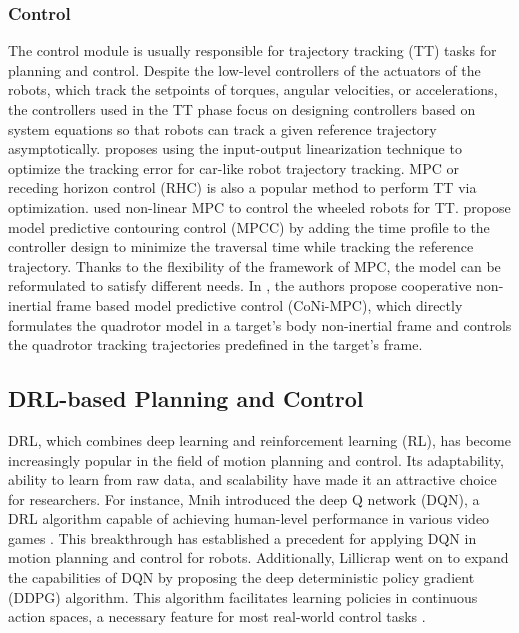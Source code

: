 \documentclass[letterpaper,journal,twoside]{IEEEtran}
\begin{document}
\subsubsection{Control}
The control module is usually responsible for trajectory 
tracking (TT) tasks for planning and control.
Despite the low-level controllers of the actuators of the 
robots, which track the setpoints of torques, angular 
velocities, or accelerations, the controllers used in the TT
phase focus on designing controllers based on system
equations so that robots can track a given reference 
trajectory asymptotically. 
\cite{majd2019stable} proposes using the input-output 
linearization technique to optimize the tracking error for
car-like robot trajectory tracking.
MPC or receding horizon control (RHC)
is also a popular method to perform TT via optimization.
\cite{kunhe2005mobile} used non-linear MPC to control the 
wheeled robots for TT.
\cite{romero2022model,ji2021cmpcc} propose model predictive
contouring control (MPCC) by adding the time profile to the 
controller design to minimize the traversal time while tracking
the reference trajectory.
Thanks to the flexibility of the framework of MPC, the model 
can be reformulated to satisfy different needs. 
In \cite{zhang2023coni}, the authors propose cooperative 
non-inertial frame based model predictive control (CoNi-MPC), 
which directly formulates the quadrotor model in a target's 
body non-inertial frame and controls the quadrotor tracking 
trajectories predefined in the target's frame.

\subsection{DRL-based Planning and Control}
DRL, which combines deep learning 
and reinforcement learning (RL), 
has become increasingly popular in the field of motion planning 
and control. 
Its adaptability, ability to learn from raw data, and scalability 
have made it an attractive choice for researchers.
For instance, Mnih \etal introduced the deep Q network (DQN), 
a DRL algorithm capable of achieving human-level performance in various video games \cite{mnih2015human}. 
This breakthrough has established a precedent for applying 
DQN in motion planning and control for robots. 
Additionally, Lillicrap \etal went on to expand the 
capabilities of DQN by proposing the deep deterministic policy 
gradient (DDPG) algorithm. 
This algorithm facilitates learning policies in continuous action 
spaces, a necessary feature for most real-world control tasks 
\cite{lillicrap2015continuous}.
\end{document}
